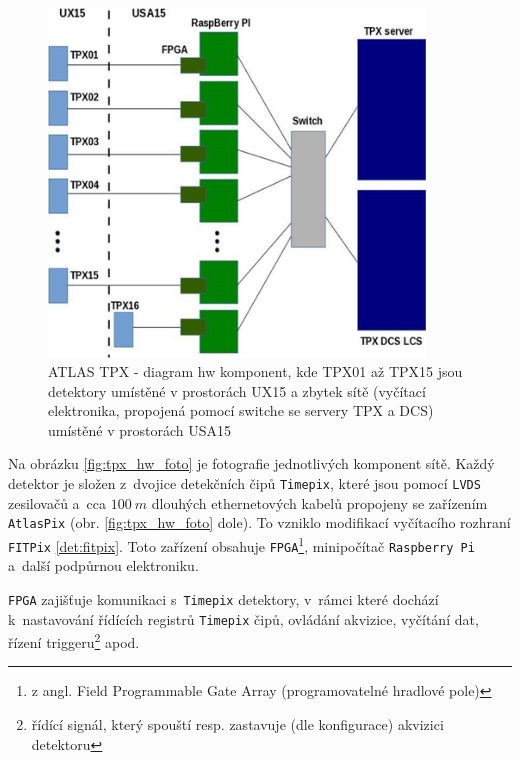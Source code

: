 \begin{figure}[t]
	\begin{center}
		\includegraphics[width=10cm]{figures/tpx_hw_diagram.png}
		\caption{ATLAS TPX - diagram hw komponent, kde TPX01 až TPX15 jsou detektory umístěné v prostorách UX15 a zbytek sítě (vyčítací elektronika, propojená pomocí switche se servery TPX a DCS) umístěné v prostorách USA15}
		\label{fig:tpx_hw_diagram}
	\end{center}
\end{figure}

Na obrázku \ref{fig:tpx_hw_foto} je fotografie jednotlivých komponent sítě. Každý detektor je složen z~dvojice detekčních čipů \texttt{Timepix}, které jsou pomocí \texttt{LVDS} zesilovačů a~cca $100~m$ dlouhých ethernetových kabelů propojeny se zařízením \texttt{AtlasPix} (obr. \ref{fig:tpx_hw_foto} dole). To vzniklo modifikací vyčítacího rozhraní \texttt{FITPix} \ref{det:fitpix}. Toto zařízení obsahuje \texttt{FPGA}\footnote{z angl. Field Programmable Gate Array (programovatelné hradlové pole)}, minipočítač \texttt{Raspberry Pi} a~další podpůrnou elektroniku. 

\texttt{FPGA} zajišťuje komunikaci s~\texttt{Timepix} detektory, v~rámci které dochází k~nastavování řídících registrů \texttt{Timepix} čipů, ovládání akvizice, vyčítání dat, řízení triggeru\footnote{řídící signál, který spouští resp. zastavuje (dle konfigurace) akvizici detektoru} apod.


